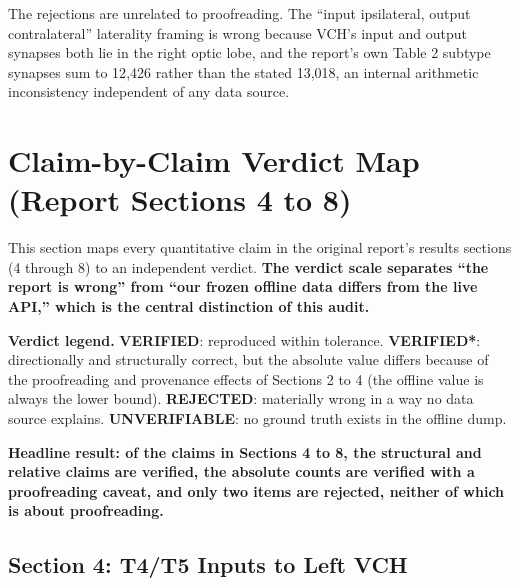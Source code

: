 \documentclass[11pt]{article}
\newcommand{\key}[1]{\textbf{#1}}
\newcommand{\Verify}{\textcolor{vgreen}{\textbf{VERIFIED}}}
\newcommand{\Caveat}{\textcolor{vamber}{\textbf{VERIFIED*}}}
\newcommand{\Reject}{\textcolor{vred}{\textbf{REJECTED}}}
\newcommand{\Open}{\textcolor{vgray}{\textbf{UNVERIFIABLE}}}
\begin{document}
The rejections are unrelated to proofreading. The ``input ipsilateral, output
contralateral'' laterality framing is wrong because VCH's input and output synapses both
lie in the right optic lobe, and the report's own Table 2 subtype synapses sum to
12{,}426 rather than the stated 13{,}018, an internal arithmetic inconsistency
independent of any data source.

\section{Claim-by-Claim Verdict Map (Report Sections 4 to 8)}

This section maps every quantitative claim in the original report's results sections
(4 through 8) to an independent verdict. \key{The verdict scale separates ``the report is
wrong'' from ``our frozen offline data differs from the live API,'' which is the central
distinction of this audit.}

\key{Verdict legend.} \Verify{}: reproduced within tolerance. \Caveat{}: directionally
and structurally correct, but the absolute value differs because of the proofreading and
provenance effects of Sections 2 to 4 (the offline value is always the lower bound).
\Reject{}: materially wrong in a way no data source explains. \Open{}: no ground truth
exists in the offline dump.

\key{Headline result: of the claims in Sections 4 to 8, the structural and relative claims
are verified, the absolute counts are verified with a proofreading caveat, and only two
items are rejected, neither of which is about proofreading.}

\subsection*{Section 4: T4/T5 Inputs to Left VCH}
\end{document}
